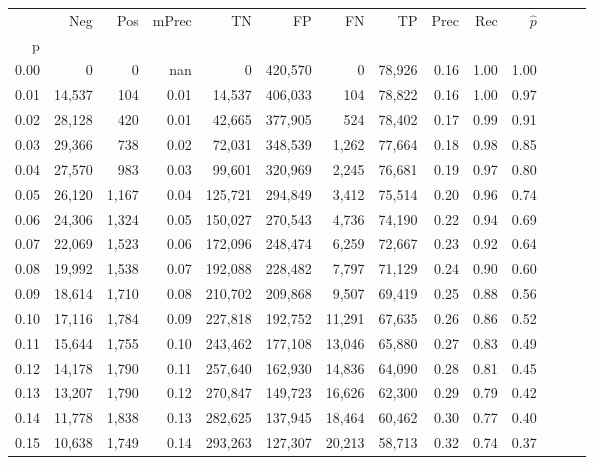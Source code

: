 \begin{tabular}{rrrrrrrrrrrrrr}
\toprule
{} &     Neg &    Pos & mPrec &       TN &       FP &      FN &      TP &  Prec &   Rec & $\hat{p}$ \\
p    &         &        &       &          &          &         &         &       &       &           \\
\midrule
0.00 &       0 &      0 &   nan &        0 &  420,570 &       0 &  78,926 &  0.16 &  1.00 &      1.00 \\
0.01 &  14,537 &    104 &  0.01 &   14,537 &  406,033 &     104 &  78,822 &  0.16 &  1.00 &      0.97 \\
0.02 &  28,128 &    420 &  0.01 &   42,665 &  377,905 &     524 &  78,402 &  0.17 &  0.99 &      0.91 \\
0.03 &  29,366 &    738 &  0.02 &   72,031 &  348,539 &   1,262 &  77,664 &  0.18 &  0.98 &      0.85 \\
0.04 &  27,570 &    983 &  0.03 &   99,601 &  320,969 &   2,245 &  76,681 &  0.19 &  0.97 &      0.80 \\
0.05 &  26,120 &  1,167 &  0.04 &  125,721 &  294,849 &   3,412 &  75,514 &  0.20 &  0.96 &      0.74 \\
0.06 &  24,306 &  1,324 &  0.05 &  150,027 &  270,543 &   4,736 &  74,190 &  0.22 &  0.94 &      0.69 \\
0.07 &  22,069 &  1,523 &  0.06 &  172,096 &  248,474 &   6,259 &  72,667 &  0.23 &  0.92 &      0.64 \\
0.08 &  19,992 &  1,538 &  0.07 &  192,088 &  228,482 &   7,797 &  71,129 &  0.24 &  0.90 &      0.60 \\
0.09 &  18,614 &  1,710 &  0.08 &  210,702 &  209,868 &   9,507 &  69,419 &  0.25 &  0.88 &      0.56 \\
0.10 &  17,116 &  1,784 &  0.09 &  227,818 &  192,752 &  11,291 &  67,635 &  0.26 &  0.86 &      0.52 \\
0.11 &  15,644 &  1,755 &  0.10 &  243,462 &  177,108 &  13,046 &  65,880 &  0.27 &  0.83 &      0.49 \\
0.12 &  14,178 &  1,790 &  0.11 &  257,640 &  162,930 &  14,836 &  64,090 &  0.28 &  0.81 &      0.45 \\
0.13 &  13,207 &  1,790 &  0.12 &  270,847 &  149,723 &  16,626 &  62,300 &  0.29 &  0.79 &      0.42 \\
0.14 &  11,778 &  1,838 &  0.13 &  282,625 &  137,945 &  18,464 &  60,462 &  0.30 &  0.77 &      0.40 \\
0.15 &  10,638 &  1,749 &  0.14 &  293,263 &  127,307 &  20,213 &  58,713 &  0.32 &  0.74 &      0.37 \\

\end{tabular}
